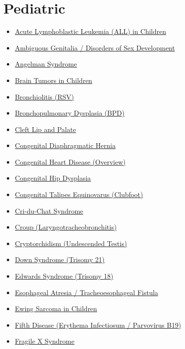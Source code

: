 \section*{Pediatric}
\label{sec:organ_pediatric}
\begin{itemize}[noitemsep]
  \item \hyperlink{sec:Acute Lymphoblastic Leukemia in Children}{Acute Lymphoblastic Leukemia (ALL) in Children}
  \item \hyperlink{sec:Ambiguous Genitalia}{Ambiguous Genitalia / Disorders of Sex Development}
  \item \hyperlink{sec:Angelman Syndrome}{Angelman Syndrome}
  \item \hyperlink{sec:Brain Tumors in Children}{Brain Tumors in Children}
  \item \hyperlink{sec:Bronchiolitis}{Bronchiolitis (RSV)}
  \item \hyperlink{sec:Bronchopulmonary Dysplasia}{Bronchopulmonary Dysplasia (BPD)}
  \item \hyperlink{sec:Cleft Lip and Palate}{Cleft Lip and Palate}
  \item \hyperlink{sec:Congenital Diaphragmatic Hernia}{Congenital Diaphragmatic Hernia}
  \item \hyperlink{sec:Congenital Heart Disease}{Congenital Heart Disease (Overview)}
  \item \hyperlink{sec:Congenital Hip Dysplasia}{Congenital Hip Dysplasia}
  \item \hyperlink{sec:Congenital Talipes Equinovarus}{Congenital Talipes Equinovarus (Clubfoot)}
  \item \hyperlink{sec:Cri-du-Chat Syndrome}{Cri-du-Chat Syndrome}
  \item \hyperlink{sec:Croup}{Croup (Laryngotracheobronchitis)}
  \item \hyperlink{sec:Cryptorchidism}{Cryptorchidism (Undescended Testis)}
  \item \hyperlink{sec:Down Syndrome}{Down Syndrome (Trisomy 21)}
  \item \hyperlink{sec:Edwards Syndrome}{Edwards Syndrome (Trisomy 18)}
  \item \hyperlink{sec:Esophageal Atresia}{Esophageal Atresia / Tracheoesophageal Fistula}
  \item \hyperlink{sec:Ewing Sarcoma in Children}{Ewing Sarcoma in Children}
  \item \hyperlink{sec:Fifth Disease (Erythema Infectiosum)}{Fifth Disease (Erythema Infectiosum / Parvovirus B19)}
  \item \hyperlink{sec:Fragile X Syndrome}{Fragile X Syndrome}

\end{itemize}

